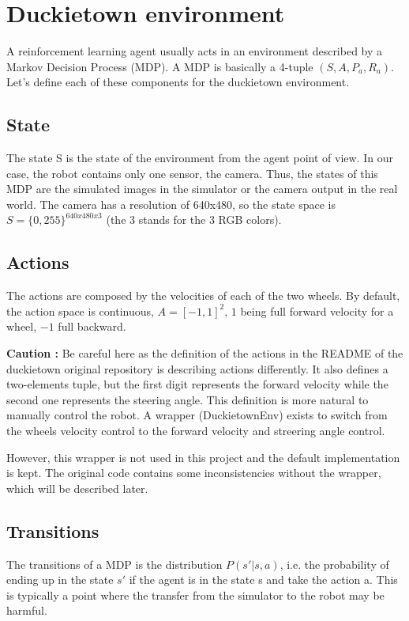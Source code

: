 \chapter{Duckietown environment}

A reinforcement learning agent usually acts in an environment described by a Markov Decision Process (MDP).
A MDP is basically a 4-tuple $(S, A, P_a, R_a)$.
Let's define each of these components for the duckietown environment.

\section{State}
The state S is the state of the environment from the agent point of view.
In our case, the robot contains only one sensor, the camera.
Thus, the states of this MDP are the simulated images in the simulator or the camera output in the real world.
The camera has a resolution of 640x480, so the state space is $S = \{0, 255\}^{640x480x3}$ (the 3 stands for the 3 RGB colors).

\section{Actions}
The actions are composed by the velocities of each of the two wheels.
By default, the action space is continuous, $A = [-1, 1]^2$, $1$ being full forward velocity for a wheel, $-1$ full backward.

\textbf{Caution :}
Be careful here as the definition of the actions in the README of the duckietown original repository is describing actions differently.
It also defines a two-elements tuple, but the first digit represents the forward velocity while the second one represents the steering angle.
This definition is more natural to manually control the robot.
A wrapper (DuckietownEnv) exists to switch from the wheels velocity control to the forward velocity and streering angle control.

However, this wrapper is not used in this project and the default implementation is kept.
The original code contains some inconsistencies without the wrapper, which will be described later.

\section{Transitions}
The transitions of a MDP is the distribution $P(s'| s, a)$, i.e. the probability of ending up in the state $s'$ if the agent is in the state s and take the action a.
This is typically a point where the transfer from the simulator to the robot may be harmful.

